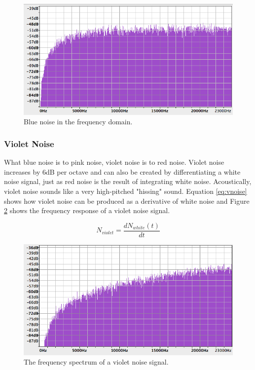 \begin{figure}[hb!]
  \includegraphics[scale=0.6]{img/bnoisef}
  \caption{Blue noise in the frequency domain.}
  \label{fig:bnoisef}
\end{figure}

\pagebreak

\subsubsection{Violet Noise}

What blue noise is to pink noise, violet noise is to red noise. Violet noise increases by 6dB per octave and can also be created by differentiating a white noise signal, just as red noise is the result of integrating white noise. Acoustically, violet noise sounds like a very high-pitched "hissing" sound. Equation \ref{eq:vnoise} shows how violet noise can be produced as a derivative of white noise and Figure \ref{fig:vnoisef} shows the frequency response of a violet noise signal.

\begin{equation}
  N_{violet} = \frac{dN_{white}(t)}{dt}
  \label{eq:vnoise}
\end{equation}

\begin{figure}
  \includegraphics[scale=0.6]{img/vnoisef}
  \caption{The frequency spectrum of a violet noise signal.}
  \label{fig:vnoisef}
\end{figure}
